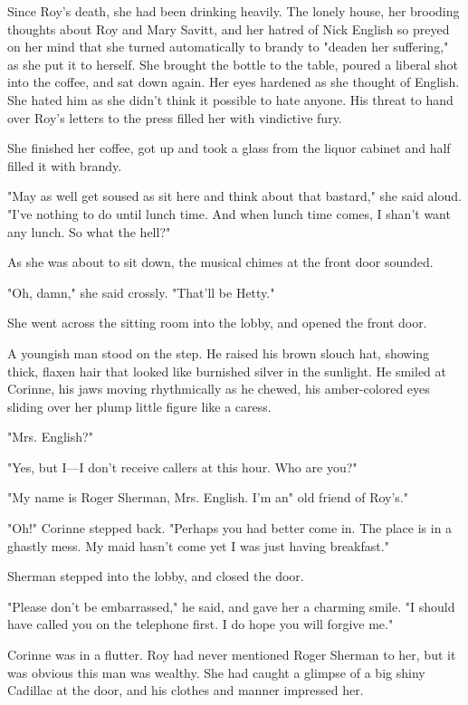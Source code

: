 \documentclass{novel}
\begin{document}
Since Roy's death, she had been drinking heavily. The lonely house, her brooding thoughts about Roy and Mary Savitt, and her hatred of Nick English so preyed on her mind that she turned automatically to brandy to "deaden her suffering," as she put it to herself. She brought the bottle to the table, poured a liberal shot into the coffee, and sat down again. Her eyes hardened as she thought of English. She hated him as she didn't think it possible to hate anyone. His threat to hand over Roy's letters to the press filled her with vindictive fury.

She finished her coffee, got up and took a glass from the liquor cabinet and half filled it with brandy.

"May as well get soused as sit here and think about that bastard," she said aloud. "I've nothing to do until lunch time. And when lunch time comes, I shan't want any lunch. So what the hell?"

As she was about to sit down, the musical chimes at the front door sounded.

"Oh, damn," she said crossly. "That'll be Hetty."

She went across the sitting room into the lobby, and opened the front door.

A youngish man stood on the step. He raised his brown slouch hat, showing thick, flaxen hair that looked like burnished silver in the sunlight. He smiled at Corinne, his jaws moving rhythmically as he chewed, his amber-colored eyes sliding over her plump little figure like a caress.

"Mrs. English?"

"Yes, but I—I don't receive callers at this hour. Who are you?"

"My name is Roger Sherman, Mrs. English. I'm an" old friend of Roy's."

"Oh!" Corinne stepped back. "Perhaps you had better come in. The place is in a ghastly mess. My maid hasn't come yet I was just having breakfast."

Sherman stepped into the lobby, and closed the door.

"Please don't be embarrassed," he said, and gave her a charming smile. "I should have called you on the telephone first. I do hope you will forgive me."

Corinne was in a flutter. Roy had never mentioned Roger Sherman to her, but it was obvious this man was wealthy. She had caught a glimpse of a big shiny Cadillac at the door, and his clothes and manner impressed her.
\end{document}
